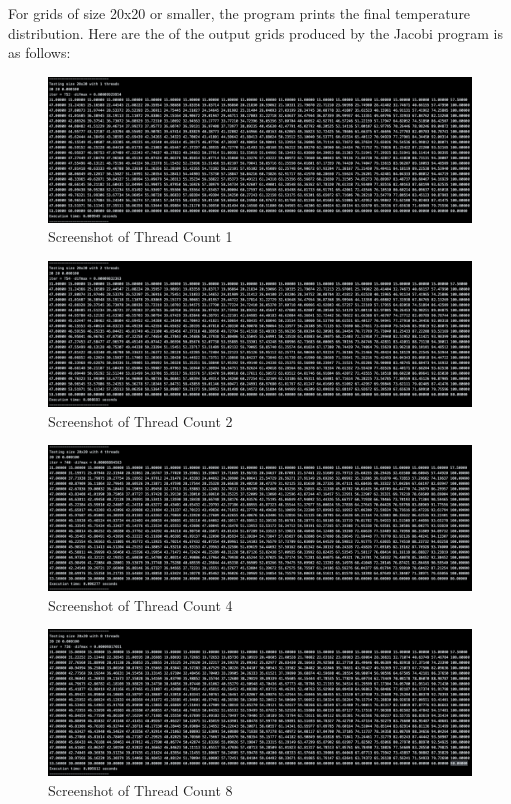 \documentclass{article}
\begin{document}
For grids of size 20x20 or smaller, the program prints the final temperature distribution. Here are the of the output grids produced by the Jacobi program is as follows:

\begin{figure}[H]
    \centering
    \includegraphics[width=\linewidth]{Images/Thread1.png}
    \caption{Screenshot of Thread Count 1}
    \label{fig:thread1}
\end{figure}

\begin{figure}[H]
    \centering
    \includegraphics[width=\linewidth]{Images/Thread2.png}
    \caption{Screenshot of Thread Count 2}
    \label{fig:thread2}
\end{figure}

\begin{figure}[H]
    \centering
    \includegraphics[width=\linewidth]{Images/Thread4.png}
    \caption{Screenshot of Thread Count 4}
    \label{fig:thread4}
\end{figure}

\begin{figure}[H]
    \centering
    \includegraphics[width=\linewidth]{Images/Thread8.png}
    \caption{Screenshot of Thread Count 8}
    \label{fig:thread8}
\end{figure}
\end{document}
